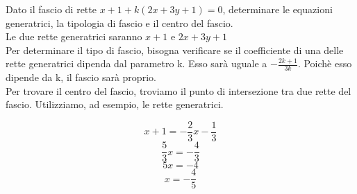 \documentclass[10pt,a4paper]{article}
\begin{document}
Dato il fascio di rette $x+1 + k(2x+3y+1) = 0$, determinare le equazioni generatrici, la tipologia di fascio e il centro del fascio.\\

Le due rette generatrici saranno $x+1$ e $2x+3y+1$\\

Per determinare il tipo di fascio, bisogna verificare se il coefficiente di una delle rette generatrici dipenda dal parametro k. Esso sarà uguale a $-\frac{2k+1}{3k}$. Poichè esso dipende da k, il fascio sarà proprio.\\

Per trovare il centro del fascio, troviamo il punto di intersezione tra due rette del fascio. Utilizziamo, ad esempio, le rette generatrici.

$$x+1 = -\frac{2}{3}x -\frac{1}{3}$$
$$\frac{5}{3}x = -\frac{4}{3}$$
$$5x = -4$$
$$x= -\frac{4}{5}$$
	
\end{document}
